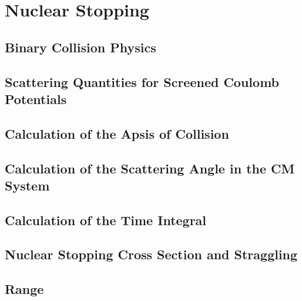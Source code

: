 \documentclass[twoside,12pt]{book}
\begin{document}
%

%
%
\begin{titlepage}

\end{titlepage}
%
%
\tableofcontents
\thispagestyle{empty}
%
%
\chapter{Nuclear Stopping}
\label{k:sn}
%
\section{Binary Collision Physics}
\label{s:bcp}

%
\section{Scattering Quantities for Screened Coulomb Potentials}
\label{s:screen}


\section{Calculation of the Apsis of Collision}
\label{s:apsis}


\section{Calculation of the Scattering Angle in the CM System}
\label{s:cmangle}


\section{Calculation of the Time Integral}
\label{s:time}


\section{Nuclear Stopping Cross Section and Straggling}
\label{s:stopping}


\section{Range}
\label{s:range}

\end{document}

